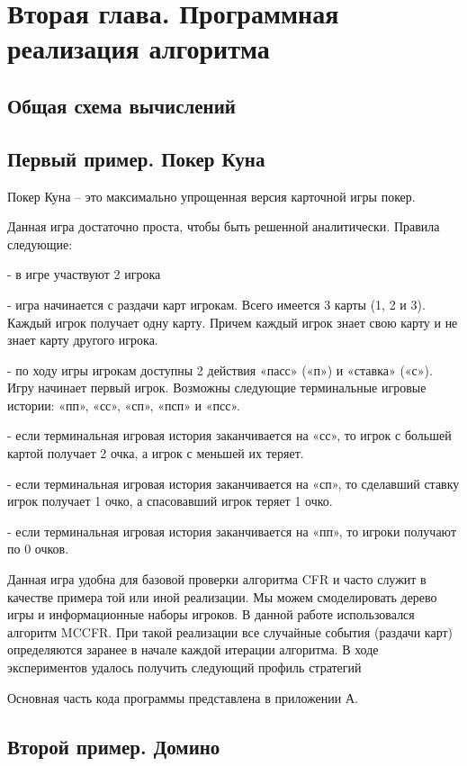 \chapter{Вторая глава. Программная реализация алгоритма}
\label{cha:ch_2}
\section{Общая схема вычислений}
\section{Первый пример. Покер Куна}

Покер Куна – это максимально упрощенная версия карточной игры покер.

Данная игра достаточно проста, чтобы быть решенной аналитически. Правила следующие:

- в игре участвуют 2 игрока

- игра начинается с раздачи карт игрокам. Всего имеется 3 карты (1, 2 и 3). Каждый игрок получает одну карту. Причем каждый игрок знает свою карту и не знает карту другого игрока.

- по ходу игры игрокам доступны 2 действия «пасс» («п») и «ставка» («с»). Игру начинает первый игрок. Возможны следующие терминальные игровые истории: «пп», «сс», «сп», «псп» и «псс».

- если терминальная игровая история заканчивается на «сс», то игрок с большей картой получает 2 очка, а игрок с меньшей их теряет.

- если терминальная игровая история заканчивается на «сп», то сделавший ставку игрок получает 1 очко, а спасовавший игрок теряет 1 очко.

- если терминальная игровая история заканчивается на «пп», то игроки получают по 0 очков.

Данная игра удобна для базовой проверки алгоритма CFR и часто служит в качестве примера той или иной реализации. Мы можем смоделировать дерево игры и информационные наборы игроков. В данной работе использовался алгоритм MCCFR. При такой реализации все случайные события (раздачи карт) определяются заранее в начале каждой итерации алгоритма. В ходе экспериментов удалось получить следующий профиль стратегий

Основная часть кода программы представлена в приложении А.

\section{Второй пример. Домино}

